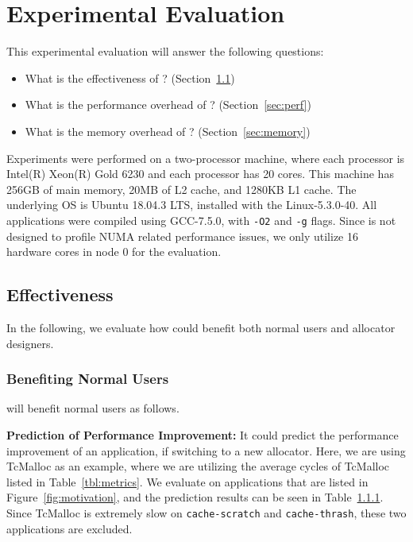 \section{Experimental Evaluation}
\label{sec:evaluation}

This experimental evaluation will answer the following questions:
\begin{itemize}
\item What is the effectiveness of \MP{}? (Section~\ref{sec:effectiveness}) 	
\item What is the performance overhead of \MP{}? (Section~\ref{sec:perf})
\item What is the memory overhead of \MP{}? (Section~\ref{sec:memory})
\end{itemize}

Experiments were performed on a two-processor machine, where each processor is Intel(R) Xeon(R) Gold 6230 and each processor has 20 cores. This machine has 256GB of main memory, 20MB of L2 cache, and 1280KB L1 cache. The underlying OS is Ubuntu 18.04.3 LTS, installed with the Linux-5.3.0-40. All applications were compiled using GCC-7.5.0, with \texttt{-O2} and \texttt{-g} flags. Since \MP{} is not designed to profile NUMA related performance issues, we only utilize 16 hardware cores in node 0 for the evaluation. 

\subsection{Effectiveness}
\label{sec:effectiveness}

In the following, we evaluate how \MP{} could benefit both normal users and allocator designers. 

\subsubsection{Benefiting Normal Users}

\MP{} will benefit normal users as follows. 

\textbf{Prediction of Performance Improvement:} It could predict the performance improvement of an application, if switching to a new allocator. Here, we are using TcMalloc as an example, where we are utilizing the average cycles of TcMalloc listed in Table~\ref{tbl:metrics}. We evaluate on applications that are listed in Figure~\ref{fig:motivation}, and the  prediction results can be seen in Table~\ref{}. Since TcMalloc is extremely slow on \texttt{cache-scratch} and \texttt{cache-thrash}, these two applications are excluded. 

